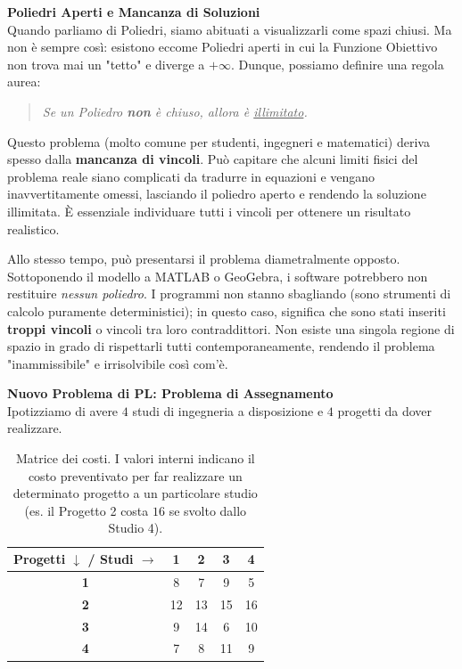 \documentclass[12pt, a4paper]{article}
\renewcommand{\arraystretch}{1.25}
\newcommand{\separatore}{\noindent{\color{titlecolor!50}\rule{\textwidth}{0.6pt}}}
\begin{document}
	\vspace{0.4cm}
	\textbf{Poliedri Aperti e Mancanza di Soluzioni}\\
	Quando parliamo di Poliedri, siamo abituati a visualizzarli come spazi chiusi. Ma non è sempre così: esistono eccome Poliedri aperti in cui la Funzione Obiettivo non trova mai un "tetto" e diverge a $+\infty$. Dunque, possiamo definire una regola aurea:
	\begin{quote}
		\textit{Se un Poliedro \textbf{non} è chiuso, allora è \underline{illimitato}.}
	\end{quote}
	Questo problema (molto comune per studenti, ingegneri e matematici) deriva spesso dalla \textbf{mancanza di vincoli}. Può capitare che alcuni limiti fisici del problema reale siano complicati da tradurre in equazioni e vengano inavvertitamente omessi, lasciando il poliedro aperto e rendendo la soluzione illimitata. È essenziale individuare tutti i vincoli per ottenere un risultato realistico.
	
	Allo stesso tempo, può presentarsi il problema diametralmente opposto. Sottoponendo il modello a MATLAB o GeoGebra, i software potrebbero non restituire \textit{nessun poliedro}. I programmi non stanno sbagliando (sono strumenti di calcolo puramente deterministici); in questo caso, significa che sono stati inseriti \textbf{troppi vincoli} o vincoli tra loro contraddittori. Non esiste una singola regione di spazio in grado di rispettarli tutti contemporaneamente, rendendo il problema "inammissibile" e irrisolvibile così com'è. 
	
	\vspace{0.6cm}
	\separatore
	\vspace{0.4cm}
	
	\textbf{Nuovo Problema di PL: Problema di Assegnamento}\\
	Ipotizziamo di avere $4$ studi di ingegneria a disposizione e $4$ progetti da dover realizzare.
	
	\begin{table}[H]
		\centering
		\renewcommand{\arraystretch}{1.3}
		\begin{tabular}{|c|c|c|c|c|}
			\hline
			\textbf{Progetti $\downarrow$ / Studi $\rightarrow$} & \textbf{1} & \textbf{2} & \textbf{3} & \textbf{4}\\ \hline
			\textbf{1} & 8 & 7 & 9 & 5 \\ \hline
			\textbf{2} & 12 & 13 & 15 & 16 \\ \hline
			\textbf{3} & 9 & 14 & 6 & 10 \\ \hline
			\textbf{4} & 7 & 8 & 11 & 9 \\ \hline
		\end{tabular}
		\caption{Matrice dei costi. I valori interni indicano il costo preventivato per far realizzare un determinato progetto a un particolare studio (es. il Progetto 2 costa $16$ se svolto dallo Studio 4).}
	\end{table}
	
\end{document}
